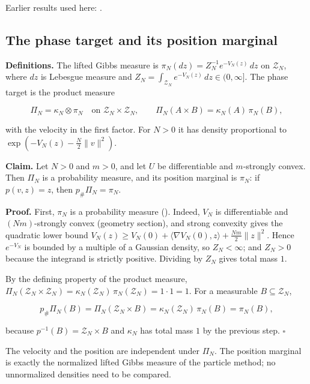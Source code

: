 \documentclass[11pt,a4paper]{report}
\begin{document}
Earlier results used here: \cite[Section~3.1.1]{LangevinLean2026IPLA}.
\subsection{\texorpdfstring{The phase target and its position marginal}{The phase target and its position marginal}}
\label{report-step-KIPLMC-Target-lean-2}


\textbf{Definitions.} The lifted Gibbs measure is \(\pi_N(dz)=Z_N^{-1}e^{-V_N(z)}\,dz\) on \(\mathcal Z_N\), where \(dz\) is Lebesgue measure and \(Z_N=\int_{\mathcal Z_N}e^{-V_N(z)}\,dz\in(0,\infty]\). The phase target is the product measure


\[\Pi_N=\kappa_N\otimes\pi_N\quad\text{on }\mathcal Z_N\times\mathcal Z_N,\qquad\Pi_N(A\times B)=\kappa_N(A)\,\pi_N(B),\]


with the velocity in the first factor. For \(N>0\) it has density proportional to \(\exp(-V_N(z)-\frac N2\|v\|^2)\).




\textbf{Claim.} Let \(N>0\) and \(m>0\), and let \(U\) be differentiable and \(m\)-strongly convex. Then \(\Pi_N\) is a probability measure, and its position marginal is \(\pi_N\): if \(p(v,z)=z\), then \(p_\#\Pi_N=\pi_N\).




\textbf{Proof.} First, \(\pi_N\) is a probability measure (\cite[Section~3.5.1]{LangevinLean2026IPLA}). Indeed, \(V_N\) is differentiable and \((Nm)\)-strongly convex (geometry section), and strong convexity gives the quadratic lower bound \(V_N(z)\ge V_N(0)+\langle\nabla V_N(0),z\rangle+\frac{Nm}2\|z\|^2\). Hence \(e^{-V_N}\) is bounded by a multiple of a Gaussian density, so \(Z_N<\infty\); and \(Z_N>0\) because the integrand is strictly positive. Dividing by \(Z_N\) gives total mass \(1\).




By the defining property of the product measure, \(\Pi_N(\mathcal Z_N\times\mathcal Z_N)=\kappa_N(\mathcal Z_N)\,\pi_N(\mathcal Z_N)=1\cdot1=1\). For a measurable \(B\subseteq\mathcal Z_N\),


\[p_\#\Pi_N(B)=\Pi_N(\mathcal Z_N\times B)=\kappa_N(\mathcal Z_N)\,\pi_N(B)=\pi_N(B),\]


because \(p^{-1}(B)=\mathcal Z_N\times B\) and \(\kappa_N\) has total mass \(1\) by the previous step. \(\square\)




The velocity and the position are independent under \(\Pi_N\). The position marginal is exactly the normalized lifted Gibbs measure of the particle method; no unnormalized densities need to be compared.
\end{document}
